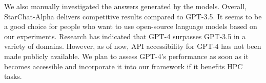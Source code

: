 We also manually investigated the answers generated by the models. Overall, StarChat-Alpha delivers competitive results compared to GPT-3.5. It seems to be a good choice for people who want to use open-source language models based on our experiments. Research has indicated that GPT-4 surpasses GPT-3.5 in a variety of domains. However, as of now, API accessibility for GPT-4 has not been made publicly available. We plan to assess GPT-4's performance as soon as it becomes accessible and incorporate it into our framework if it benefits HPC tasks.









